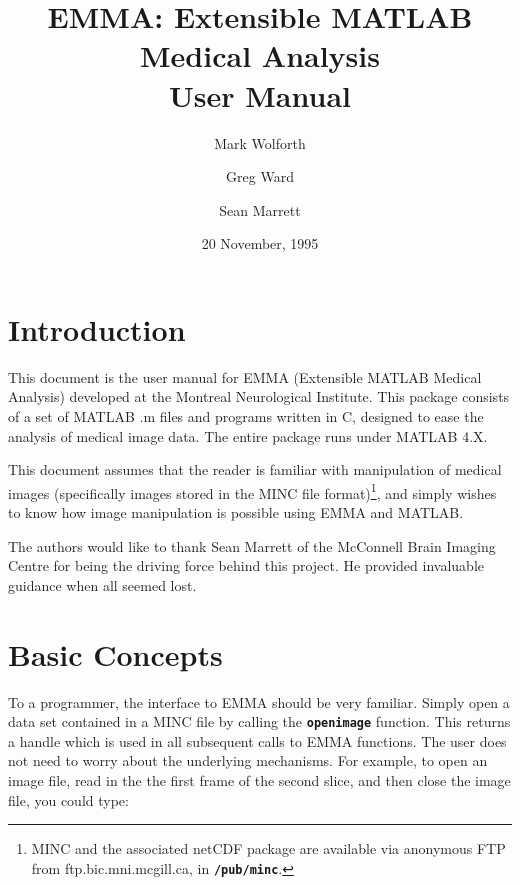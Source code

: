 
\title{EMMA: Extensible MATLAB Medical Analysis \\ User Manual}

\author{Mark Wolforth \and Greg Ward \and Sean Marrett}
\date{20 November, 1995}

\def\code#1{{\tt \bf #1}}

 

\maketitle
\newpage

\tableofcontents

\newpage
\section{Introduction}


This document is the user manual for EMMA (Extensible MATLAB Medical
Analysis) developed at the Montreal Neurological Institute.  This
package consists of a set of MATLAB .m files and programs written in
C, designed to ease the analysis of medical image data.  The entire
package runs under MATLAB 4.X.

This document assumes that the reader is familiar with manipulation of
medical images (specifically images stored in the MINC file
format)\footnote{MINC and the associated netCDF package are available
via anonymous FTP from ftp.bic.mni.mcgill.ca, in \code{/pub/minc}.},
and simply wishes to know how image manipulation is possible using EMMA
and MATLAB.

The authors would like to thank Sean Marrett of the McConnell Brain
Imaging Centre for being the driving force behind this project.  He
provided invaluable guidance when all seemed lost.

\newpage
\section{Basic Concepts}

To a programmer, the interface to EMMA should be very familiar.
Simply open a data set contained in a MINC file by calling the
\code{openimage} function.  This returns a handle which is used in all
subsequent calls to EMMA functions.  The user does not need to worry
about the underlying mechanisms.  For example, to open an image file,
read in the the first frame of the second slice, and then close the
image file, you could type:

